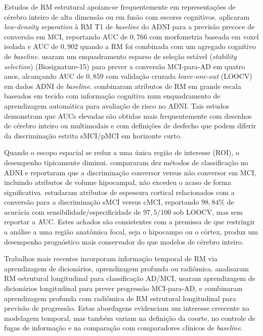 \documentclass[review]{elsarticle}
\begin{document}
	Estudos de RM estrutural apoiam-se frequentemente em representações de cérebro inteiro de alta dimensão ou em fusão com escores cognitivos. \citet{moradi-2015} aplicaram \emph{low-density separation} à RM T1 de \textit{baseline} do ADNI para a previsão precoce de conversão em MCI, reportando AUC de $0,766$ com morfometria baseada em voxel isolada e AUC de $0,902$ quando a RM foi combinada com um agregado cognitivo de \textit{baseline}. \citet{ye-2012} usaram um enquadramento esparso de seleção estável (\emph{stability selection}) (Biosignature-15) para prever a conversão MCI-para-AD em quatro anos, alcançando AUC de $0,859$ com validação cruzada \emph{leave-one-out} (LOOCV) em dados ADNI de \textit{baseline}. \citet{casanova-2013} combinaram atributos de RM em grande escala baseados em tecido com informação cognitiva num enquadramento de aprendizagem automática para avaliação de risco no ADNI. Tais estudos demonstram que AUCs elevadas são obtidas mais frequentemente com desenhos de cérebro inteiro ou multimodais e com definições de desfecho que podem diferir da discriminação estrita sMCI/pMCI em horizonte curto.
	
	Quando o escopo espacial se reduz a uma única região de interesse (ROI), o desempenho tipicamente diminui. \citet{cuingnet-2011} compararam dez métodos de classificação no ADNI e reportaram que a discriminação conversor versus não conversor em MCI, incluindo atributos de volume hipocampal, não excedeu o acaso de forma significativa. \citet{guo-2017a} estudaram atributos de espessura cortical relacionados com a conversão para a discriminação sMCI versus cMCI, reportando $98,84\%$ de acurácia com sensibilidade/especificidade de $97,5/100$ sob LOOCV, mas sem reportar a AUC. Estes achados são consistentes com a premissa de que restringir a análise a uma região anatômica focal, seja o hipocampo ou o córtex, produz um desempenho prognóstico mais conservador do que modelos de cérebro inteiro.
	
	Trabalhos mais recentes incorporam informação temporal de RM via aprendizagem de dicionários, aprendizagem profunda ou radiômica. \citet{zhang-2019} analisaram RM estrutural longitudinal para classificação AD/MCI, \citet{lin-2020} usaram aprendizagem de dicionários longitudinal para prever progressão MCI-para-AD, e \citet{aghajanian-2025} combinaram aprendizagem profunda com radiômica de RM estrutural longitudinal para previsão de progressão. Estas abordagens evidenciam um interesse crescente na modelagem temporal, mas também variam na definição da coorte, no controle de fugas de informação e na comparação com comparadores clínicos de \textit{baseline}.
	
\end{document}
